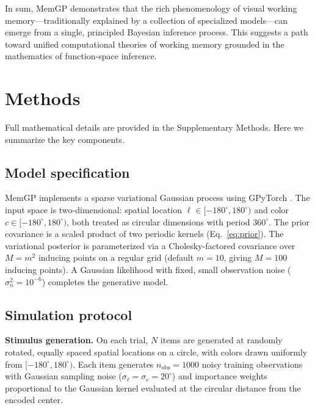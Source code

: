 \documentclass[11pt,letterpaper]{article}
\begin{document}
In sum, MemGP demonstrates that the rich phenomenology of visual working memory---traditionally explained by a collection of specialized models---can emerge from a single, principled Bayesian inference process. This suggests a path toward unified computational theories of working memory grounded in the mathematics of function-space inference.

\section{Methods}

Full mathematical details are provided in the Supplementary Methods. Here we summarize the key components.

\subsection{Model specification}

MemGP implements a sparse variational Gaussian process \cite{tiaoHandbookSparseVariational2019} using GPyTorch \cite{gardnerGPyTorchBlackboxMatrixMatrix2018}. The input space is two-dimensional: spatial location $\ell \in [-180^\circ, 180^\circ)$ and color $c \in [-180^\circ, 180^\circ)$, both treated as circular dimensions with period $360^\circ$. The prior covariance is a scaled product of two periodic kernels (Eq.~\ref{eq:prior}). The variational posterior is parameterized via a Cholesky-factored covariance over $M = m^2$ inducing points on a regular grid (default $m = 10$, giving $M = 100$ inducing points). A Gaussian likelihood with fixed, small observation noise ($\sigma^2_n = 10^{-6}$) completes the generative model.

\subsection{Simulation protocol}

\textbf{Stimulus generation.} On each trial, $N$ items are generated at randomly rotated, equally spaced spatial locations on a circle, with colors drawn uniformly from $[-180^\circ, 180^\circ)$. Each item generates $n_{\mathrm{obs}} = 1000$ noisy training observations with Gaussian sampling noise ($\sigma_\ell = \sigma_c = 20^\circ$) and importance weights proportional to the Gaussian kernel evaluated at the circular distance from the encoded center.
\end{document}
